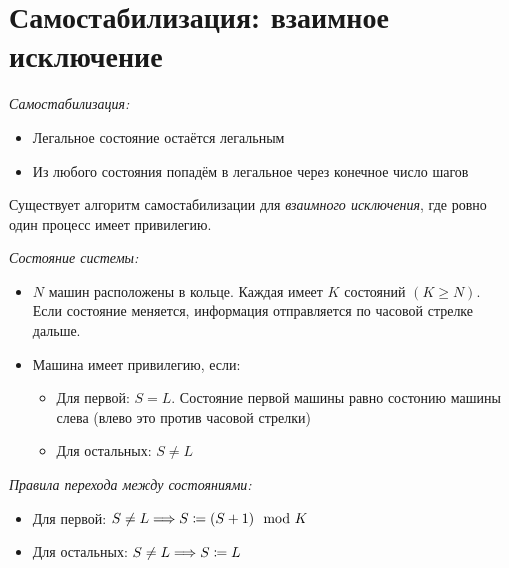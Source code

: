 \section{Самостабилизация: взаимное исключение}

\begin{definition} \textit{Самостабилизация:}
    \begin{itemize}
        \item Легальное состояние остаётся легальным
        \item Из любого состояния попадём в легальное через конечное число шагов
    \end{itemize}
\end{definition}

\begin{example} Существует алгоритм самостабилизации для \textit{взаимного исключения}, где ровно один процесс имеет привилегию.
\end{example}

\begin{definition} \textit{Состояние системы:}
    \begin{itemize}
        \item $N$ машин расположены в кольце. Каждая имеет $K$ состояний $(K \geqslant N)$.
            Если состояние меняется, информация отправляется по часовой стрелке дальше.
        \item Машина имеет привилегию, если:
            \begin{itemize}
                \item Для первой: $S = L$. Состояние первой машины равно состонию машины слева
                    (влево это против часовой стрелки)
                \item Для остальных: $S \neq L$
            \end{itemize}
    \end{itemize}
\end{definition}

\begin{definition} \textit{Правила перехода между состояниями:}
    \begin{itemize}
        \item Для первой: $S \neq L \Longrightarrow S \coloneqq (S + 1) \mod K$
        \item Для остальных: $S \neq L \Longrightarrow S \coloneqq L$
    \end{itemize}
\end{definition}

